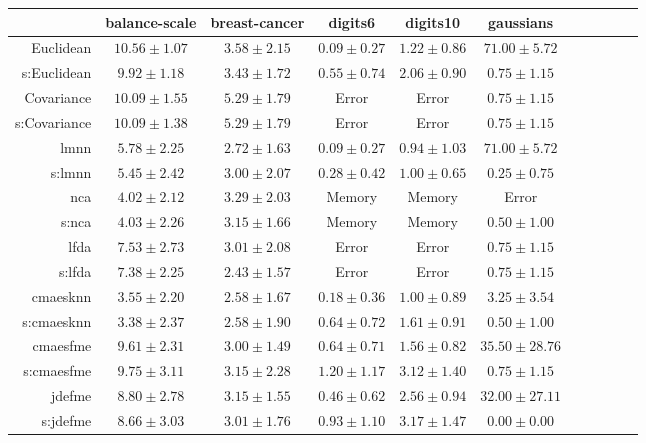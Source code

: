 \begin{table}[ht] \centering
{\small\renewcommand{\arraystretch}{0.95}
\setlength{\tabcolsep}{1pt}
\begin{tabular}{rcccccccccc}
\toprule


& \multicolumn{1}{c}{balance-scale} & \multicolumn{1}{c}{breast-cancer} & \multicolumn{1}{c}{digits6} & \multicolumn{1}{c}{digits10} & \multicolumn{1}{c}{gaussians} \\ 
\midrule
Euclidean & $10.56\pm1.07$ & $3.58\pm2.15$ & $\bm{0.09\pm0.27}$ & $1.22\pm0.86$ & $71.00\pm5.72$ \\
s:Euclidean & $9.92\pm1.18$ & $3.43\pm1.72$ & $0.55\pm0.74$ & $2.06\pm0.90$ & $0.75\pm1.15$ \\
Covariance & $10.09\pm1.55$ & $5.29\pm1.79$ & Error  & Error  & $0.75\pm1.15$ \\
s:Covariance & $10.09\pm1.38$ & $5.29\pm1.79$ & Error  & Error  & $0.75\pm1.15$ \\
\ac{lmnn} & $5.78\pm2.25$ & $2.72\pm1.63$ & $\bm{0.09\pm0.27}$ & $\bm{0.94\pm1.03}$ & $71.00\pm5.72$ \\
s:\ac{lmnn} & $5.45\pm2.42$ & $3.00\pm2.07$ & $0.28\pm0.42$ & $1.00\pm0.65$ & $0.25\pm0.75$ \\
\ac{nca} & $4.02\pm2.12$ & $3.29\pm2.03$ & Memory  & Memory  & Error  \\
s:\ac{nca} & $4.03\pm2.26$ & $3.15\pm1.66$ & Memory  & Memory  & $0.50\pm1.00$ \\
\ac{lfda} & $7.53\pm2.73$ & $3.01\pm2.08$ & Error  & Error  & $0.75\pm1.15$ \\
s:\ac{lfda} & $7.38\pm2.25$ & $\bm{2.43\pm1.57}$ & Error  & Error  & $0.75\pm1.15$ \\
\ac{cmaesknn} & $3.55\pm2.20$ & $2.58\pm1.67$ & $0.18\pm0.36$ & $1.00\pm0.89$ & $3.25\pm3.54$ \\
s:\ac{cmaesknn} & $\bm{3.38\pm2.37}$ & $2.58\pm1.90$ & $0.64\pm0.72$ & $1.61\pm0.91$ & $0.50\pm1.00$ \\
\ac{cmaesfme} & $9.61\pm2.31$ & $3.00\pm1.49$ & $0.64\pm0.71$ & $1.56\pm0.82$ & $35.50\pm28.76$ \\
s:\ac{cmaesfme} & $9.75\pm3.11$ & $3.15\pm2.28$ & $1.20\pm1.17$ & $3.12\pm1.40$ & $0.75\pm1.15$ \\
\ac{jdefme} & $8.80\pm2.78$ & $3.15\pm1.55$ & $0.46\pm0.62$ & $2.56\pm0.94$ & $32.00\pm27.11$ \\
s:\ac{jdefme} & $8.66\pm3.03$ & $3.01\pm1.76$ & $0.93\pm1.10$ & $3.17\pm1.47$ & $\bm{0.00\pm0.00}$ \\

\end{tabular}}
\end{table}
